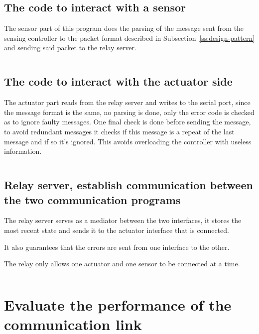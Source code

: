 \documentclass[10pt]{article}
\begin{document}
\subsection{The code to interact with a sensor}

The sensor part of this program does the parsing of the message sent from the
sensing controller to the packet format described in
Subsection~\ref{ss:design-pattern} and sending said packet to the relay server.

\inputminted[obeytabs=true,tabsize=2]{go}{../communication/serial_interface/sensor.go}

\subsection{The code to interact with the actuator side}

The actuator part reads from the relay server and writes to the serial port,
since the message format is the same, no parsing is done, only the error
code is checked as to ignore faulty messages. One final check is done before
sending the message, to avoid redundant messages it checks if this message is a
repeat of the last message and if so it's ignored. This avoids overloading the
controller with useless information.

\inputminted[obeytabs=true,tabsize=2]{go}{../communication/serial_interface/actuator.go}

\subsection{Relay server, establish communication between the two communication
programs}

The relay server serves as a mediator between the two interfaces, it stores the
most recent state and sends it to the actuator interface that is connected.

It also guarantees that the errors are sent from one interface to the other.

The relay only allows one actuator and one sensor to be connected at a time.

\inputminted[obeytabs=true,tabsize=2]{go}{../communication/relay_server/main.go}

\section{Evaluate the performance of the communication link}\label{ss:perf}
\end{document}
